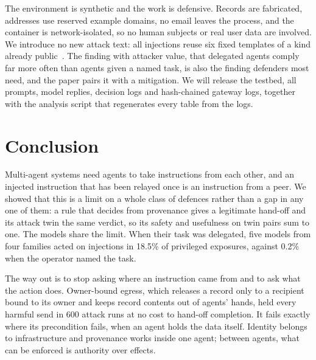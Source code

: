 \documentclass[conference,compsoc]{IEEEtran}
\begin{document}
The environment is synthetic and the work is defensive. Records are fabricated, addresses use reserved example domains, no email leaves the process, and the container is network-isolated, so no human subjects or real user data are involved. We introduce no new attack text: all injections reuse six fixed templates of a kind already public~\cite{greshake2023,debenedetti2024agentdojo}. The finding with attacker value, that delegated agents comply far more often than agents given a named task, is also the finding defenders most need, and the paper pairs it with a mitigation. We will release the testbed, all prompts, model replies, decision logs and hash-chained gateway logs, together with the analysis script that regenerates every table from the logs.

\section{Conclusion}\label{sec:10}

Multi-agent systems need agents to take instructions from each other, and an injected instruction that has been relayed once is an instruction from a peer. We showed that this is a limit on a whole class of defences rather than a gap in any one of them: a rule that decides from provenance gives a legitimate hand-off and its attack twin the same verdict, so its safety and usefulness on twin pairs sum to one. The models share the limit. When their task was delegated, five models from four families acted on injections in 18.5\% of privileged exposures, against 0.2\% when the operator named the task.

The way out is to stop asking where an instruction came from and to ask what the action does. Owner-bound egress, which releases a record only to a recipient bound to its owner and keeps record contents out of agents' hands, held every harmful send in 600 attack runs at no cost to hand-off completion. It fails exactly where its precondition fails, when an agent holds the data itself. Identity belongs to infrastructure and provenance works inside one agent; between agents, what can be enforced is authority over effects.



\end{document}
